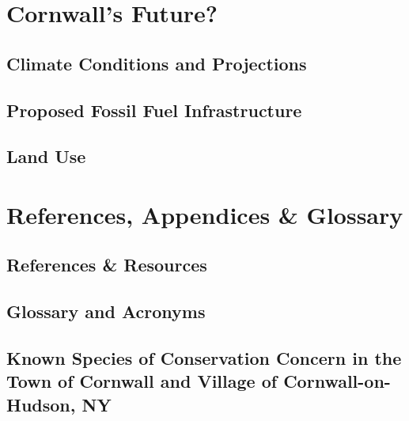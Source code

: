 \documentclass[11pt,fleqn, openany]{book} %
\begin{document}
\part{Cornwall's Future?}
\chapter{Climate Conditions and Projections}\label{sec:climate}


\chapter{Proposed Fossil Fuel Infrastructure}\label{sec:fossil}


\chapter{Land Use}\label{sec:landuse}



\part{References, Appendices \& Glossary}
\chapter{References \& Resources}
\label{sec:references}
\printbibliography


\chapter{Glossary and Acronyms}\label{subsec:glossary}
\glsaddall
\renewcommand{\glossarysection}[2][]{}
\printglossary

\chapter{Known Species of Conservation Concern in the Town of Cornwall 
and Village of Cornwall-on-Hudson, NY}

\end{document}
